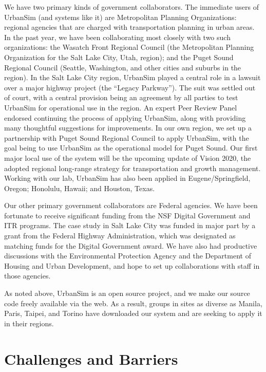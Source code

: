 \documentclass[11pt]{article}
\begin{document}
We have two primary kinds of government collaborators.  The immediate users
of UrbanSim (and systems like it) are Metropolitan Planning Organizations:
regional agencies that are charged with transportation planning in urban
areas.  In the past year, we have been collaborating most closely with two
such organizations: the Wasatch Front Regional Council (the Metropolitan
Planning Organization for the Salt Lake City, Utah, region); and the Puget
Sound Regional Council (Seattle, Washington, and other cities and suburbs
in the region).  In the Salt Lake City region, UrbanSim played a central
role in a lawsuit over a major highway project (the ``Legacy Parkway'').
The suit was settled out of court, with a central provision being an
agreement by all parties to test UrbanSim for operational use in the
region.  An expert Peer Review Panel endorsed continuing the process of
applying UrbanSim, along with providing many thoughtful suggestions for
improvements.  In our own region, we set up a partnership with Puget Sound
Regional Council to apply UrbanSim, with the goal being to use UrbanSim as
the operational model for Puget Sound.  Our first major local use of the
system will be the upcoming update of Vision 2020, the adopted regional
long-range strategy for transportation and growth management.  Working with
our lab, UrbanSim has also been applied in Eugene/Springfield, Oregon;
Honolulu, Hawaii; and Houston, Texas.

Our other primary government collaborators are Federal agencies.  We have
been fortunate to receive significant funding from the NSF Digital
Government and ITR programs.  The case study in Salt Lake City was funded
in major part by a grant from the Federal Highway Administration, which was
designated as matching funds for the Digital Government award.  We have
also had productive discussions with the Environmental Protection Agency
and the Department of Housing and Urban Development, and hope to set up
collaborations with staff in those agencies.

As noted above, UrbanSim is an open source project, and we make our source
code freely available via the web.  As a result, groups in sites as diverse
as Manila, Paris, Taipei, and Torino have downloaded our system and are
seeking to apply it in their regions.

\section{Challenges and Barriers}
\end{document}
